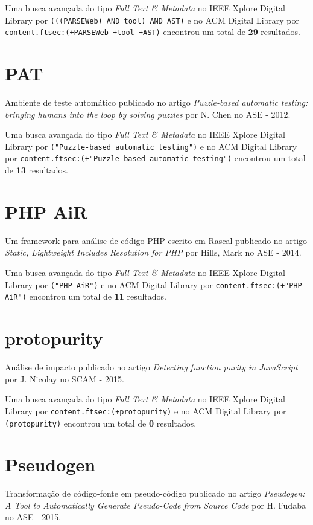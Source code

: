 Uma busca avançada do tipo {\it Full Text \& Metadata} no IEEE Xplore Digital Library por
\texttt{(((PARSEWeb) AND tool) AND AST)}
e no ACM Digital Library por
\texttt{content.ftsec:(+PARSEWeb +tool +AST)}
encontrou um total de
{\bf 29}
resultados.

\section{PAT}

Ambiente de teste automático
publicado no artigo
{\it Puzzle-based automatic testing: bringing humans into the loop by solving puzzles}
por
N. Chen
no
ASE
-
2012.


Uma busca avançada do tipo {\it Full Text \& Metadata} no IEEE Xplore Digital Library por
\texttt{("Puzzle-based automatic testing")}
e no ACM Digital Library por
\texttt{content.ftsec:(+"Puzzle-based automatic testing")}
encontrou um total de
{\bf 13}
resultados.

\section{PHP AiR}

Um framework para análise de código PHP escrito em Rascal
publicado no artigo
{\it Static, Lightweight Includes Resolution for PHP}
por
Hills, Mark
no
ASE
-
2014.


Uma busca avançada do tipo {\it Full Text \& Metadata} no IEEE Xplore Digital Library por
\texttt{("PHP AiR")}
e no ACM Digital Library por
\texttt{content.ftsec:(+"PHP AiR")}
encontrou um total de
{\bf 11}
resultados.

\section{protopurity}

Análise de impacto
publicado no artigo
{\it Detecting function purity in JavaScript}
por
J. Nicolay
no
SCAM
-
2015.


Uma busca avançada do tipo {\it Full Text \& Metadata} no IEEE Xplore Digital Library por
\texttt{content.ftsec:(+protopurity)}
e no ACM Digital Library por
\texttt{(protopurity)}
encontrou um total de
{\bf 0}
resultados.

\section{Pseudogen}

Transformação de código-fonte em pseudo-código
publicado no artigo
{\it Pseudogen: A Tool to Automatically Generate Pseudo-Code from Source Code}
por
H. Fudaba
no
ASE
-
2015.


